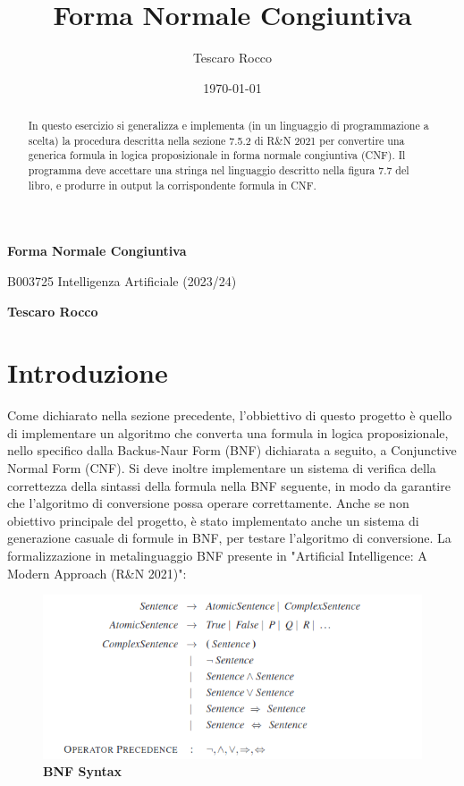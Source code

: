 \documentclass{article} %
\title{Forma Normale Congiuntiva}
\author{Tescaro Rocco}
\date{\today}
\begin{document}
\thispagestyle{plain}
\begin{center}
    \Large
    \textbf{Forma Normale Congiuntiva}
    
    \vspace{0.2cm}
    \large
    B003725 Intelligenza Artificiale (2023/24)
    
    \vspace{0.4cm}
    \textbf{Tescaro Rocco}
    \vspace{0.2cm}
\end{center}

\begin{abstract}
    
In questo esercizio si generalizza e implementa (in un linguaggio di programmazione a scelta) la procedura descritta nella sezione 7.5.2 di R\&N 2021 per convertire una generica formula in logica proposizionale in forma normale congiuntiva (CNF). Il programma deve accettare una stringa nel linguaggio descritto nella figura 7.7 del libro, e produrre in output la corrispondente formula in CNF.

\end{abstract}

\section*{Introduzione} 

Come dichiarato nella sezione precedente, l'obbiettivo di questo progetto è quello di implementare un algoritmo che converta una formula in logica proposizionale, nello specifico dalla Backus-Naur Form (BNF) dichiarata a seguito, a Conjunctive Normal Form (CNF).
Si deve inoltre implementare un sistema di verifica della correttezza della sintassi della formula nella BNF seguente, in modo da garantire che l'algoritmo di conversione possa operare correttamente. Anche se non obiettivo principale del progetto, è stato implementato anche un sistema di generazione casuale di formule in BNF, per testare l'algoritmo di conversione.
La formalizzazione in metalinguaggio BNF presente in "Artificial Intelligence: A Modern Approach (R\&N 2021)":

\begin{figure}[htbp]
    \caption{\textbf{BNF Syntax}}
    \centering
    \includegraphics[width=\linewidth]{bnf}
\end{figure}
\end{document}
